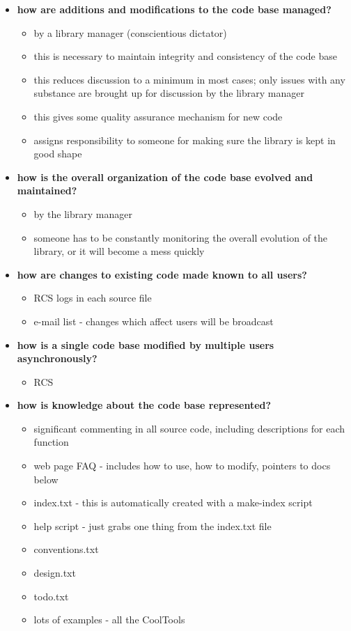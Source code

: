 \begin{itemize}
\item {\bf how are additions and modifications to the code base managed?}
	\begin{itemize}
	\item by a library manager (conscientious dictator)
	\item this is necessary to maintain integrity and consistency of the code base
	\item this reduces discussion to a minimum in most cases; only issues with
			any substance are brought up for discussion by the library manager
	\item this gives some quality assurance mechanism for new code
	\item assigns responsibility to someone for making sure the library is kept
			in good shape
	\end{itemize}
\item {\bf how is the overall organization of the code base evolved and 
	maintained?}
	\begin{itemize}
	\item by the library manager
	\item someone has to be constantly monitoring the overall evolution of the
			library, or it will become a mess quickly
	\end{itemize}
\item {\bf how are changes to existing code made known to all users?}
	\begin{itemize}
	\item RCS logs in each source file
	\item e-mail list - changes which affect users will be broadcast
	\end{itemize}
\item {\bf how is a single code base modified by multiple users asynchronously?}
	\begin{itemize}
	\item RCS
	\end{itemize}
\item {\bf how is knowledge about the code base represented?}
	\begin{itemize}
	\item significant commenting in all source code, including descriptions for
			each function
	\item web page FAQ - includes how to use, how to modify, pointers to docs
			below
	\item index.txt - this is automatically created with a make-index script
	\item help script - just grabs one thing from the index.txt file
	\item conventions.txt
	\item design.txt
	\item todo.txt
	\item lots of examples - all the CoolTools
	\end{itemize}
\end{itemize}


